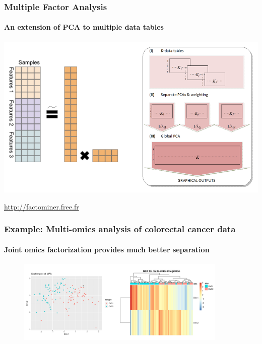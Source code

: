 \documentclass{beamer}
\begin{document}
\begin{frame}
	\frametitle{Multiple Factor Analysis}
	\framesubtitle{An extension of PCA to multiple data tables}
	\begin{center}
		\includegraphics[height=0.7\textheight]{images/multipleFactorAnalysis.png}
	\end{center}

    {\center \large \url{http://factominer.free.fr}}
\end{frame}

\begin{frame}
	\frametitle{Example: Multi-omics analysis of colorectal cancer data}
	\framesubtitle{Joint omics factorization provides much better separation}	
	\begin{figure}[ht]
		\centering
		\includegraphics[width=100mm]{images/multipleFactorAnalysisInColonCancer.png}
	\end{figure}
\end{frame}
\end{document}
